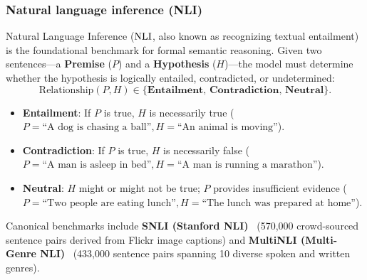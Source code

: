 \documentclass[../../../main.tex]{subfiles}
\begin{document}
\subsubsection{Natural language inference (NLI)}
\label{subsec:nli_reasoning}
Natural Language Inference ($\mathrm{NLI}$, also known as recognizing textual entailment) is the foundational benchmark for formal semantic reasoning. Given two sentences---a \textbf{Premise} ($P$) and a \textbf{Hypothesis} ($H$)---the model must determine whether the hypothesis is logically entailed, contradicted, or undetermined:
\begin{equation}
\label{eq:nli_labels}
\text{Relationship}(P, H) \in \{\textbf{Entailment}, \, \textbf{Contradiction}, \, \textbf{Neutral}\}.
\end{equation}
\begin{itemize}
    \item \textbf{Entailment}: If $P$ is true, $H$ is necessarily true ($P = \text{``A dog is chasing a ball''}, H = \text{``An animal is moving''}$).
    \item \textbf{Contradiction}: If $P$ is true, $H$ is necessarily false ($P = \text{``A man is asleep in bed''}, H = \text{``A man is running a marathon''}$).
    \item \textbf{Neutral}: $H$ might or might not be true; $P$ provides insufficient evidence ($P = \text{``Two people are eating lunch''}, H = \text{``The lunch was prepared at home''}$).
\end{itemize}
Canonical benchmarks include \textbf{SNLI (Stanford NLI)}~\cite{bowman2015snli} (570,000 crowd-sourced sentence pairs derived from Flickr image captions) and \textbf{MultiNLI (Multi-Genre NLI)}~\cite{williams2018multinli} (433,000 sentence pairs spanning 10 diverse spoken and written genres).
\end{document}
